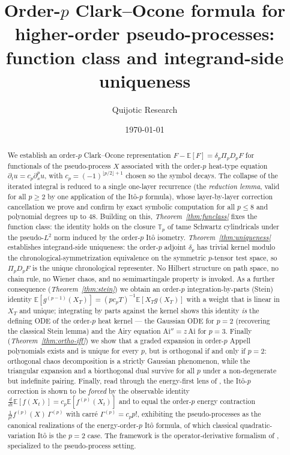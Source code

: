 \documentclass[11pt,reqno]{amsart}
\title{Order-$p$ Clark--Ocone formula for higher-order pseudo-processes:\\
function class and integrand-side uniqueness}
\author{Quijotic Research}
\date{\today}
\theoremstyle{plain}
\theoremstyle{definition}
\newcommand{\E}{\mathbb{E}}
\begin{document}
\maketitle

\begin{abstract}
We establish an order-$p$ Clark--Ocone representation
$F - \E[F] = \delta_p \Pi_p D_p F$
for functionals of the pseudo-process $X$ associated with the order-$p$ heat-type equation $\partial_t u = c_p \partial_x^p u$, with $c_p = (-1)^{\lfloor p/2\rfloor + 1}$ chosen so the symbol decays. The collapse of the iterated integral is reduced to a single one-layer recurrence (the \emph{reduction lemma}, valid for all $p \geq 2$ by one application of the Itô-$p$ formula), whose layer-by-layer correction cancellation we prove and confirm by exact symbolic computation for all $p \leq 8$ and polynomial degrees up to $48$. Building on this, \emph{Theorem~\ref{thm:funclass}} fixes the function class: the identity holds on the closure $\mathbb{T}_p$ of tame Schwartz cylindricals under the pseudo-$L^2$ norm induced by the order-$p$ Itô isometry. \emph{Theorem~\ref{thm:uniqueness}} establishes integrand-side uniqueness: the order-$p$ adjoint $\delta_p$ has trivial kernel modulo the chronological-symmetrization equivalence on the symmetric $p$-tensor test space, so $\Pi_p D_p F$ is the unique chronological representer.
No Hilbert structure on path space, no chain rule, no Wiener chaos, and no semimartingale property is invoked. As a further consequence (\emph{Theorem~\ref{thm:stein}}) we obtain an order-$p$ integration-by-parts (Stein) identity $\E[g^{(p-1)}(X_T)] = (p c_p T)^{-1}\E[X_T g(X_T)]$ with a weight that is linear in $X_T$ and unique; integrating by parts against the kernel shows this identity \emph{is} the defining ODE of the order-$p$ heat kernel --- the Gaussian ODE for $p=2$ (recovering the classical Stein lemma) and the Airy equation $\mathrm{Ai}''=z\,\mathrm{Ai}$ for $p=3$. Finally (\emph{Theorem~\ref{thm:ortho-iff}}) we show that a graded expansion in order-$p$ Appell polynomials exists and is unique for every $p$, but is orthogonal if and only if $p=2$: orthogonal chaos decomposition is a strictly Gaussian phenomenon, while the triangular expansion and a biorthogonal dual survive for all $p$ under a non-degenerate but indefinite pairing. Finally, read through the energy-first lens of \cite{operatorDerivativeI}, the It\^o-$p$ correction is shown to be \emph{forced} by the observable identity $\tfrac{d}{dt}\E[f(X_t)] = c_p\E[f^{(p)}(X_t)]$ and to equal the order-$p$ energy contraction $\tfrac{1}{p!}f^{(p)}(X)\,\Gamma^{(p)}$ with carr\'e $\Gamma^{(p)} = c_p p!$, exhibiting the pseudo-processes as the canonical realizations of the energy-order-$p$ It\^o formula, of which classical quadratic-variation It\^o is the $p=2$ case. The framework is the operator-derivative formalism of \cite{operatorDerivativeI}, specialized to the pseudo-process setting.
\end{abstract}
\end{document}
